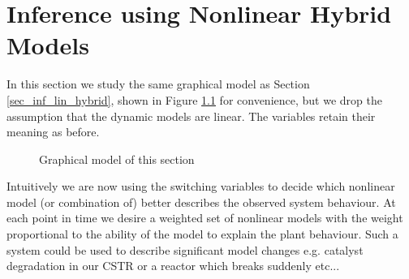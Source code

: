 \chapter{Inference using Nonlinear Hybrid Models}
\label{sec_inf_spf}
In this section we study the same graphical model as Section \ref{sec_inf_lin_hybrid}, shown in Figure \ref{fig_hybridmod2} for convenience, but we drop the assumption that the dynamic models are linear. The variables retain their meaning as before.     
\begin{figure}[H] 
\centering
{}
\caption{Graphical model of this section}
\label{fig_hybridmod2}
\end{figure}
Intuitively we are now using the switching variables to decide which nonlinear model (or combination of) better describes the observed system behaviour. At each point in time we desire a weighted set of nonlinear models with the weight proportional to the ability of the model to explain the plant behaviour. Such a system could be used to describe significant model changes e.g. catalyst degradation in our CSTR or a reactor which breaks suddenly etc... 

